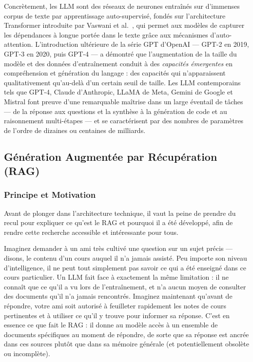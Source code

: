 \documentclass[a4paper,11pt]{article}
\begin{document}
Concrètement, les LLM sont des réseaux de neurones entraînés sur d'immenses
corpus de texte par apprentissage auto-supervisé, fondés sur l'architecture
Transformer introduite par Vaswani et al.\ \cite{vaswani2017attention}, qui
permet aux modèles de capturer les dépendances à longue portée dans le texte
grâce aux mécanismes d'auto-attention. L'introduction ultérieure de la série
GPT d'OpenAI --- GPT-2 en 2019, GPT-3 en 2020, puis GPT-4 --- a démontré
que l'augmentation de la taille du modèle et des données d'entraînement
conduit à des \emph{capacités émergentes} en compréhension et génération du
langage \cite{wei2022emergent} : des capacités qui n'apparaissent
qualitativement qu'au-delà d'un certain seuil de taille. Les LLM contemporains
tels que GPT-4, Claude d'Anthropic, LLaMA de Meta, Gemini de Google et
Mistral font preuve d'une remarquable maîtrise dans un large éventail de
tâches --- de la réponse aux questions et la synthèse à la génération de
code et au raisonnement multi-étapes --- et se caractérisent par des nombres
de paramètres de l'ordre de dizaines ou centaines de milliards.

\subsection{Génération Augmentée par Récupération (RAG)}

\subsubsection{Principe et Motivation}
Avant de plonger dans l'architecture technique, il vaut la peine de prendre
du recul pour expliquer ce qu'est le RAG et pourquoi il a été développé,
afin de rendre cette recherche accessible et intéressante pour tous.

Imaginez demander à un ami très cultivé une question sur un sujet précis ---
disons, le contenu d'un cours auquel il n'a jamais assisté. Peu importe son
niveau d'intelligence, il ne peut tout simplement pas savoir ce qui a été
enseigné dans ce cours particulier. Un LLM fait face à exactement la même
limitation : il ne connaît que ce qu'il a vu lors de l'entraînement, et n'a
aucun moyen de consulter des documents qu'il n'a jamais rencontrés. Imaginez
maintenant qu'avant de répondre, votre ami soit autorisé à feuilleter
rapidement les notes de cours pertinentes et à utiliser ce qu'il y trouve
pour informer sa réponse. C'est en essence ce que fait le RAG : il donne au
modèle accès à un ensemble de documents spécifiques au moment de répondre,
de sorte que sa réponse est ancrée dans ces sources plutôt que dans sa mémoire
générale (et potentiellement obsolète ou incomplète).
\end{document}

